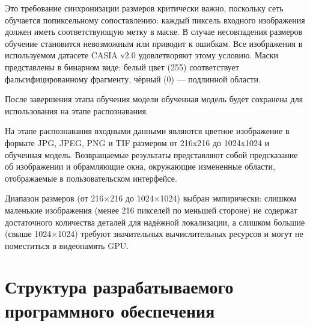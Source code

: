 Это требование синхронизации размеров критически важно, поскольку сеть обучается попиксельному сопоставлению: каждый пиксель входного изображения должен иметь соответствующую метку в маске. В случае несовпадения размеров обучение становится невозможным или приводит к ошибкам. Все изображения в используемом датасете CASIA v2.0 удовлетворяют этому условию. Маски представлены в бинарном виде: белый цвет (255) соответствует фальсифицированному фрагменту, чёрный (0) — подлинной области.

После завершения этапа обучения модели обученная модель будет сохранена для использования на этапе распознавания.

На этапе распознавания входными данными являются цветное изображение в формате JPG, JPEG, PNG и TIF размером от 216x216 до 1024x1024 и обученная модель. Возвращаемые результаты представляют собой предсказание об изображении и обрамляющие окна, окружающие измененные области, отображаемые в пользовательском интерфейсе.

Диапазон размеров (от 216×216 до 1024×1024) выбран эмпирически: слишком маленькие изображения (менее 216 пикселей по меньшей стороне) не содержат достаточного количества деталей для надёжной локализации, а слишком большие (свыше 1024×1024) требуют значительных вычислительных ресурсов и могут не поместиться в видеопамять GPU.

\section{Структура разрабатываемого программного обеспечения}

